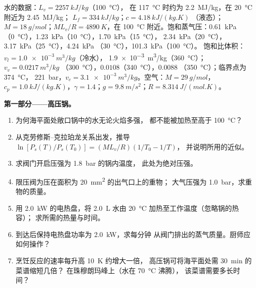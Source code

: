 \begin{problem}
\label{pb:b1:phase-changes:1}
水的数据：$L_v = \qty{2257}{kJ/kg}$（\qty{100}{\degreeCelsius}），
在 \qty{117}{\degreeCelsius} 时约为 \qty{2.2}{MJ/kg}，在 \qty{20}{\degreeCelsius} 附近为 \qty{2.45}{MJ/kg}；
$L_f = \qty{334}{kJ/kg}$；$c = \qty{4.18}{kJ/(kg.K)}$
（液态）；$M = \qty{18}{g/mol}$；$ML_v/R = \qty{4890}{K}$，在
\qty{100}{\degreeCelsius} 附近。饱和蒸气压：\qty{0.61}{kPa}
（\qty{0}{\degreeCelsius}），\qty{1.23}{kPa}（\qty{10}{\degreeCelsius}），\qty{1.70}{kPa}（\qty{15}{\degreeCelsius}），
\qty{2.34}{kPa}（\qty{20}{\degreeCelsius}），\qty{3.17}{kPa}（\qty{25}{\degreeCelsius}），\qty{4.24}{kPa}
（\qty{30}{\degreeCelsius}），\qty{101.3}{kPa}（\qty{100}{\degreeCelsius}）。
饱和比体积：$v_l = \qty{1.0e-3}{m^3/kg}$（冷水），
\qty{1.9e-3}{m^3/kg}（\qty{360}{\degreeCelsius}）；$v_v = \qty{0.0217}{m^3/kg}$
（\qty{300}{\degreeCelsius}），$0.0108$（\qty{340}{\degreeCelsius}），$0.0088$
（\qty{350}{\degreeCelsius}）；临界点为 \qty{374}{\degreeCelsius}，
\qty{221}{bar}，$v_c = \qty{3.1e-3}{m^3/kg}$。空气：$M = \qty{29}{g/mol}$，$c_p =
\qty{1.0}{kJ/(kg.K)}$，$\gamma = 1.4$；$g = \qty{9.8}{m/s^2}$；$R =
\qty{8.314}{J/(mol.K)}$。

\medskip
\noindent\textbf{第一部分——高压锅。}
\begin{enumerate}
  \item 为何海平面处敞口锅中的水无论火焰多强，
        都不能被加热至高于 \qty{100}{\degreeCelsius}？
  \item 从克劳修斯–克拉珀龙关系出发，推导
        $\ln[P_s(T)/P_s(T_0)] = (ML_v/R)(1/T_0 - 1/T)$，
        并说明所用的近似。
  \item 求阀门开启压强为 \qty{1.8}{bar} 的锅内温度，
        此处为绝对压强。
  \item 限压阀为压在面积为 \qty{20}{mm^2} 的出气口上的重物；
        大气压强为 \qty{1.0}{bar}，求重物的质量。
  \item 用 \qty{2.0}{kW} 的电热盘，将 \qty{2.0}{L} 水由 \qty{20}{\degreeCelsius}
        加热至工作温度（忽略锅的热容）；
        求所需的热量与时间。
  \item 到达后保持电热盘功率为 \qty{2.0}{kW}，求每分钟
        从阀门排出的蒸气质量。厨师应如何操作？
  \item 烹饪反应的速率每升高 \qty{10}{K} 约增大一倍，
        高压锅可将海平面处需 \qty{30}{min} 的菜谱缩短几倍？
        在珠穆朗玛峰上（水在 \qty{70}{\degreeCelsius} 沸腾），
        该菜谱需要多长时间？
\end{enumerate}


\end{problem}
